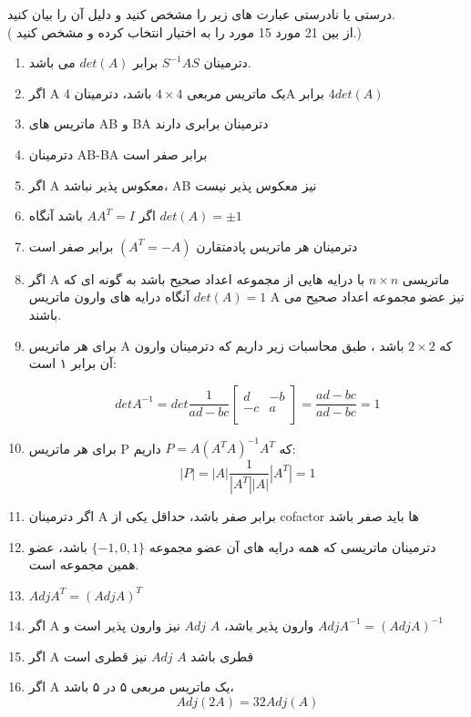 \documentclass{article}
\begin{document}
\clearpage
{}درستی یا نادرستی عبارت های زیر را مشخص کنید و دلیل آن را بیان کنید.
\\
(
از بین 21 مورد  15 مورد را به اختیار انتخاب کرده و مشخص کنید.)

\begin{enumerate}[label=\alph*)]
	\item 
	دترمینان 
	$S^{-1}AS$
	 برابر
	 $det(A)$ 	
	 می باشد.
	\item 
	اگر A یک ماتریس مربعی $4 \times 4 $ باشد، دترمینان 4A برابر 
	$4det(A)$
	\item
	ماتریس های AB و BA دترمینان برابری دارند
	\item
	دترمینان AB-BA برابر صفر است
	\item
	اگر A معکوس پذیر نباشد، AB نیز معکوس پذیر نیست
	\item 
	اگر 
	$AA^T = I$
	 باشد آنگاه
	 $ det(A) = \pm 1$
	 \item 
	 دترمینان هر ماتریس پادمتقارن
	  $(A^T = -A)$
	   برابر صفر است
	   \item 
	    اگر A ماتریسی
	     $n\times n $  
	      با درایه هایی از مجموعه اعداد صحیح باشد به گونه ای که
	     $det(A) = 1$
	     آنگاه درایه های وارون ماتریس A نیز عضو مجموعه اعداد صحیح می باشند.
	     \item 
	     برای هر ماتریس A که 
	     $2\times 2 $ 
	       باشد
	       ، طبق محاسبات زیر داریم که دترمینان وارون آن برابر ۱ است:
	     
	     $$det A^{-1} = det \frac {1}{ad-bc} 
	    \begin{bmatrix}
	      d & -b \\
	      -c &  a\\
	      \end{bmatrix} = \frac{ad-bc}{ad-bc} = 1$$
	      \item
	      
	      برای هر ماتریس P که 
	      $P = A (A^TA)^{-1}A^T$ 
	      داریم:
	      $$ |P|  =|A| \frac{1}{|A^T||A|}|A^T| = 1 $$
	      \item
	      اگر دترمینان A برابر صفر باشد، حداقل یکی از cofactor ها باید صفر باشد
	      \item 
	      دترمینان ماتریسی که همه درایه های آن عضو مجموعه
	     $\{-1,0,1\}$
	         باشد، عضو همین مجموعه است.
	      \item 
	      $Adj A^T = (Adj A)^T$
	      \item 
	      اگر A وارون پذیر باشد،
	     $A$ $Adj$ 
	        نیز وارون پذیر است و
	      $ Adj A^{-1}  = (Adj A)^{-1}$
	      \item
	      اگر A قطری باشد
	       $A$ $Adj$ 
	       نیز قطری است
	      \item
	     اگر A یک ماتریس مربعی ۵ در ۵ باشد،
	     $$Adj(2A) = 32 Adj (A)$$
	     

\end{enumerate}
\end{document}
